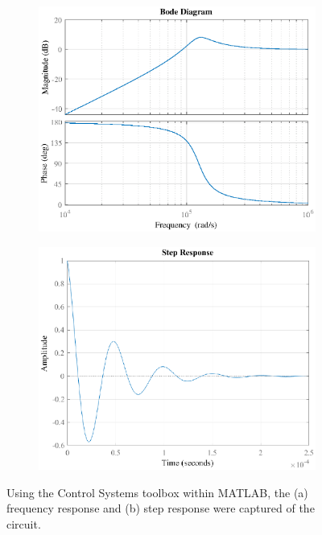 \documentclass{report}
\begin{document}
\begin{figure}[H]
	\centering
	\begin{subfigure}{0.45\textwidth}
		\centering
		\includegraphics[width=\linewidth]{exp1_matlab_bode}
		\caption{}
	\end{subfigure}
	\begin{subfigure}{0.45\textwidth}
		\centering
		\includegraphics[width=\linewidth]{exp1_matlab_step}
		\caption{}
	\end{subfigure}
	\caption{Using the Control Systems toolbox within MATLAB, the (a) frequency response and (b) step response were captured of the circuit.}
	\label{fig:exp1_matlab}	
\end{figure}
\end{document}
